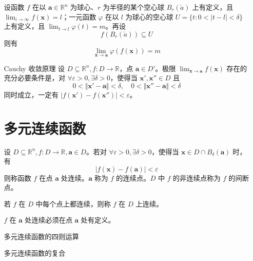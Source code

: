 \begin{theorem}
    设函数 $f$ 在以 $\bm{a} \in \mathbb{R}^n$ 为球心、$r$ 为半径的某个空心球 $B_r(\check{a})$ 上有定义，且 $\displaystyle \lim_{i \to \infty} f(\bm{x}) = l$；一元函数 $\varphi$ 在以 $l$ 为球心的空心球 $U = \{t: 0 < \vert t - l \vert < \delta\}$ 上有定义，且 $\displaystyle \lim_{t \to l} \varphi(t) = m$。再设
    \[
        f(B_r(\check{a})) \subseteq U
    \]
    则有
    \[
        \lim_{\bm{x} \to \bm{a}} \varphi(f(\bm{x})) = m
    \]
\end{theorem}

\begin{theorem}{Cauchy 收敛原理}
    设 $D \subseteq \mathbb{R}^n, f: D \to \mathbb{R}$，点 $\bm{a} \in D'$。极限 $\displaystyle \lim_{\bm{x} \to \bm{a}} f(\bm{x})$ 存在的充分必要条件是，对 $\forall \varepsilon > 0, \exists \delta > 0$，使得当 $\bm{x}', \bm{x}'' \in D$ 且
    \[
        0 < \Vert \bm{x}' - \bm{a} \Vert < \delta, \quad 0 < \Vert \bm{x}'' - \bm{a} \Vert < \delta
    \]
    同时成立，一定有 $\vert f(\bm{x}') - f(\bm{x}'') \vert < \varepsilon$。
\end{theorem}


\section{多元连续函数}

\begin{definition}
    设 $D \subseteq \mathbb{R}^n, f: D \to \mathbb{R}, \bm{a} \in D$。若对 $\forall \varepsilon > 0, \exists \delta > 0$，使得当 $\bm{x} \in D \cap B_{\delta}(\bm{a})$ 时，有
    \[
        \vert f(\bm{x}) - f(\bm{a}) \vert < \varepsilon
    \]
    则称函数 $f$ 在点 $\bm{a}$ 处连续。$\bm{a}$ 称为 $f$ 的连续点。$D$ 中 $f$ 的非连续点称为 $f$ 的间断点。

    若 $f$ 在 $D$ 中每个点上都连续，则称 $f$ 在 $D$ 上连续。
\end{definition}

\begin{remark}
    $f$ 在 $\bm{a}$ 处连续必须在点 $\bm{a}$ 处有定义。
\end{remark}

\begin{theorem}{多元连续函数的四则运算}

\end{theorem}

\begin{theorem}{多元连续函数的复合}

\end{theorem}

